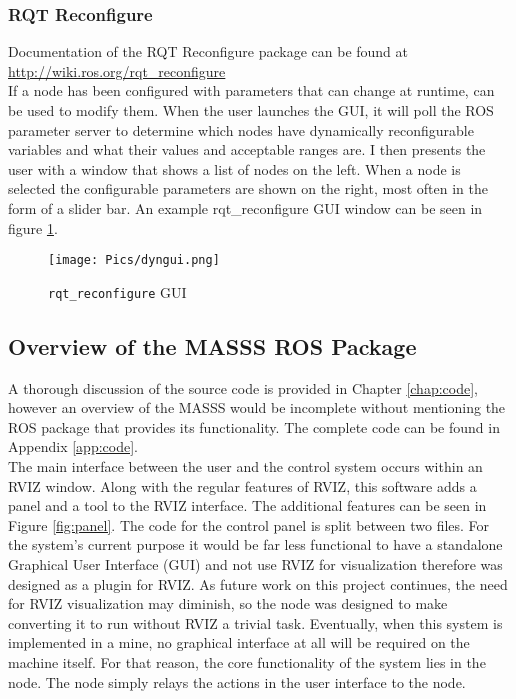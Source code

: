 \subsubsection{RQT Reconfigure}

Documentation of the RQT Reconfigure package can be found at \url{http://wiki.ros.org/rqt_reconfigure}\\

If a node has been configured with parameters that can change at runtime,  can be used to modify them. When the user launches the GUI, it will poll the ROS parameter server to determine which nodes have dynamically reconfigurable variables and what their values and acceptable ranges are. I then presents the user with a window that shows a list of nodes on the left. When a node is selected the configurable parameters are shown on the right, most often in the form of a slider bar. An example rqt\_reconfigure GUI window can be seen in figure \ref{fig:dyngui2}.

\begin{figure}[h]
    \centering
    \texttt{[image: Pics/dyngui.png]}
    \caption{\texttt{rqt\_reconfigure} GUI}
    \label{fig:dyngui2}
\end{figure}

\subsection{Overview of the MASSS ROS Package}
\label{sub:software}

A thorough discussion of the source code is provided in Chapter \ref{chap:code}, however an overview of the MASSS would be incomplete without mentioning the ROS package that provides its functionality. The complete code can be found in Appendix \ref{app:code}.\\ 

The main interface between the user and the control system occurs within an RVIZ window. Along with the regular features of RVIZ, this software adds a panel and a tool to the RVIZ interface. The additional features can be seen in Figure \ref{fig:panel}. The code for the control panel is split between two files. For the system's current purpose it would be far less functional to have a standalone Graphical User Interface (GUI) and not use RVIZ for visualization therefore  was designed as a plugin for RVIZ. As future work on this project continues, the need for RVIZ visualization may diminish, so the node was designed to make converting it to run without RVIZ a trivial task. Eventually, when this system is implemented in a mine, no graphical interface at all will be required on the machine itself. For that reason, the core functionality of the system lies in the  node. The  node simply relays the actions in the user interface to the  node.\\

